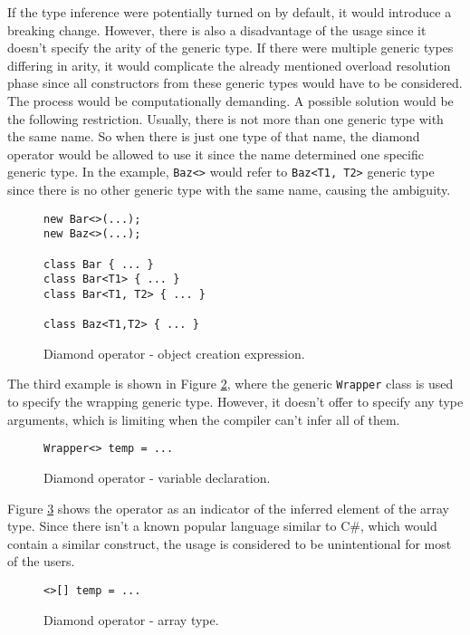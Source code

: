 If the type inference were potentially turned on by default, it would introduce a breaking change. 
However, there is also a disadvantage of the usage since it doesn’t specify the arity of the generic type. If there were multiple generic types differing in arity, it would complicate the already mentioned overload resolution phase since all constructors from these generic types would have to be considered. The process would be computationally demanding. 
A possible solution would be the following restriction. 
Usually, there is not more than one generic type with the same name. 
So when there is just one type of that name, the diamond operator would be allowed to use it since the name determined one specific generic type. 
In the example, \texttt{Baz<>} would refer to \texttt{Baz<T1, T2>} generic type since there is no other generic type with the same name, causing the ambiguity.
\begin{figure}[h]
\begin{lstlisting}[style=csharp]
new Bar<>(...);
new Baz<>(...);

class Bar { ... }
class Bar<T1> { ... }
class Bar<T1, T2> { ... }

class Baz<T1,T2> { ... }
\end{lstlisting}
\caption{Diamond operator - object creation expression.}
\label{img41:opDi2}
\end{figure}
\par
The third example is shown in Figure \ref{img42:opDi3}, where the generic \texttt{Wrapper} class is used to specify the wrapping generic type. 
However, it doesn’t offer to specify any type arguments, which is limiting when the compiler can’t infer all of them.
\begin{figure}[h]
\begin{lstlisting}[style=csharp]
Wrapper<> temp = ...
\end{lstlisting}
\caption{Diamond operator - variable declaration.}
\label{img42:opDi3}
\end{figure}
\par
Figure \ref{img43:opDi4} shows the operator as an indicator of the inferred element of the array type. 
Since there isn’t a known popular language similar to C\#, which would contain a similar construct, the usage is considered to be unintentional for most of the users.
\begin{figure}[h]
\begin{lstlisting}[style=csharp]
<>[] temp = ...
\end{lstlisting}
\caption{Diamond operator - array type.}
\label{img43:opDi4}
\end{figure}
